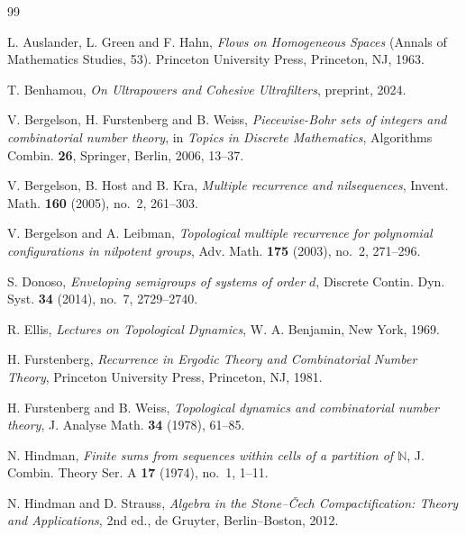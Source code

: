 \documentclass[11pt]{amsart}
\theoremstyle{definition}
\theoremstyle{remark}
\newcommand{\N}{\mathbb N}
\begin{document}
\begin{thebibliography}{99}
\setlength{\itemsep}{0.25em}

L. Auslander, L. Green and F. Hahn, \emph{Flows on Homogeneous Spaces} (Annals of Mathematics Studies,
53). Princeton University Press, Princeton, NJ, 1963.

T. Benhamou, \emph{On Ultrapowers and Cohesive Ultrafilters},
preprint, 2024.


V. Bergelson, H. Furstenberg and B. Weiss,
\emph{Piecewise-Bohr sets of integers and combinatorial number theory},
in \emph{Topics in Discrete Mathematics}, Algorithms Combin. \textbf{26},
Springer, Berlin, 2006, 13--37.

V. Bergelson, B. Host and B. Kra,
\emph{Multiple recurrence and nilsequences},
Invent. Math. \textbf{160} (2005), no.~2, 261--303.

V. Bergelson and A. Leibman,
\emph{Topological multiple recurrence for polynomial configurations in nilpotent groups},
Adv. Math. \textbf{175} (2003), no.~2, 271--296.



S. Donoso,
\emph{Enveloping semigroups of systems of order $d$},
Discrete Contin. Dyn. Syst. \textbf{34} (2014), no.~7, 2729--2740.

R. Ellis,
\emph{Lectures on Topological Dynamics},
W. A. Benjamin, New York, 1969.

H. Furstenberg,
\emph{Recurrence in Ergodic Theory and Combinatorial Number Theory},
Princeton University Press, Princeton, NJ, 1981.

H. Furstenberg and B. Weiss,
\emph{Topological dynamics and combinatorial number theory},
J. Analyse Math. \textbf{34} (1978), 61--85.

N. Hindman,
\emph{Finite sums from sequences within cells of a partition of $\N$},
J. Combin. Theory Ser. A \textbf{17} (1974), no.~1, 1--11.

N. Hindman and D. Strauss,
\emph{Algebra in the Stone--\v Cech Compactification: Theory and Applications},
2nd ed., de Gruyter, Berlin--Boston, 2012.


\end{thebibliography}
\end{document}
